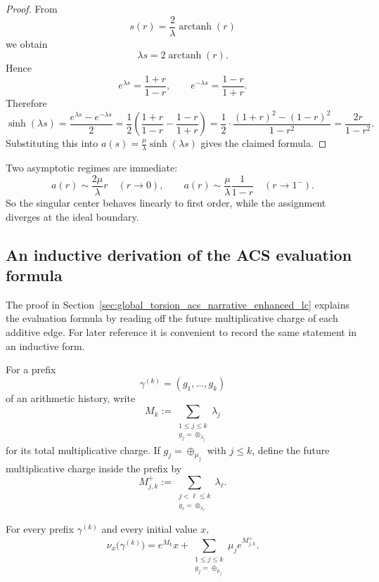 \begin{proof}
From
\[
 s(r)=\frac{2}{\lambda}\operatorname{arctanh}(r)
\]
we obtain
\[
 \lambda s = 2\operatorname{arctanh}(r).
\]
Hence
\[
 e^{\lambda s}=\frac{1+r}{1-r},
 \qquad
 e^{-\lambda s}=\frac{1-r}{1+r}.
\]
Therefore
\[
 \sinh(\lambda s)
 =\frac{e^{\lambda s}-e^{-\lambda s}}{2}
 =\frac12\left(\frac{1+r}{1-r}-\frac{1-r}{1+r}\right)
 =\frac12\cdot\frac{(1+r)^2-(1-r)^2}{1-r^2}
 =\frac{2r}{1-r^2}.
\]
Substituting this into $a(s)=\frac{\mu}{\lambda}\sinh(\lambda s)$ gives the claimed formula.
\end{proof}

Two asymptotic regimes are immediate:
\[
 a(r)\sim \frac{2\mu}{\lambda}r
 \quad (r\to 0),
 \qquad
 a(r)\sim \frac{\mu}{\lambda}\frac{1}{1-r}
 \quad (r\to 1^-).
\]
So the singular center behaves linearly to first order, while the assignment diverges at the ideal boundary.

\subsection{An inductive derivation of the ACS evaluation formula}
\label{appC:acs-induction}

The proof in Section~\ref{sec:global_torsion_acs_narrative_enhanced_lc} explains the evaluation formula by reading off the future multiplicative charge of each additive edge. For later reference it is convenient to record the same statement in an inductive form.

For a prefix
\[
\gamma^{(k)}=(g_1,\dots,g_k)
\]
of an arithmetic history, write
\[
 M_k:=\sum_{\substack{1\le j\le k\\ g_j=\otimes_{\lambda_j}}}\lambda_j
\]
for its total multiplicative charge. If $g_j=\oplus_{\mu_j}$ with $j\le k$, define the future multiplicative charge inside the prefix by
\[
 M^+_{j,k}:=\sum_{\substack{j<\ell\le k\\ g_\ell=\otimes_{\lambda_\ell}}}\lambda_\ell.
\]

\begin{proposition}
\label{prop:appC-prefix-evaluation}
For every prefix $\gamma^{(k)}$ and every initial value $x$,
\[
\nu_x\bigl(\gamma^{(k)}\bigr)
 = e^{M_k}x
   + \sum_{\substack{1\le j\le k\\ g_j=\oplus_{\mu_j}}}
     \mu_j e^{M^+_{j,k}}.
\]
\end{proposition}

